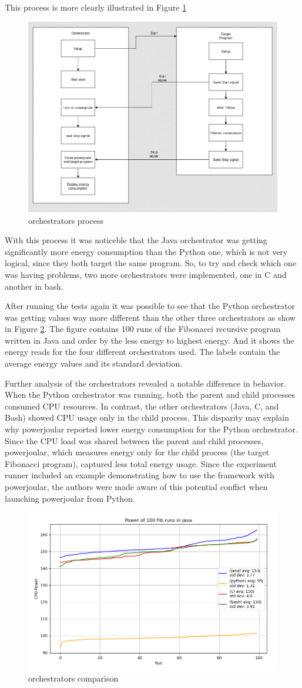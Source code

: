 \documentclass[sigplan]{acmart}
\begin{document}
This process is more clearly illustrated in Figure \ref{fig:orchestrators_process}

\begin{figure}%
  \centering
  \includegraphics[width = 0.4 \textwidth]{figures/orchestrators_process.png}
  \caption{orchestrators process}
  \label{fig:orchestrators_process}
\end{figure}

With this process it was noticeble that the Java orchestrator was getting significantly more energy consumption than the Python one, which is not very logical, since they both target the same program. So, to try and check which one was having problems, two more orchestrators were implemented, one in C and another in bash.

After running the tests again it was possible to see that the Python orchestrator was getting values way more different than the other three orchestrators as show in Figure \ref{fig:4_orchs_comparison}.
The figure contains 100 runs of the Fibonacci recursive program written in Java and order by the less energy to highest energy. And it shows the energy reads for the four different orchestrators used. The labels contain the average energy values and its standard deviation.

Further analysis of the orchestrators revealed a notable difference in behavior. When the Python orchestrator was running, both the parent and child processes consumed CPU resources. In contrast, the other orchestrators (Java, C, and Bash) showed CPU usage only in the child process. This disparity may explain why powerjoular reported lower energy consumption for the Python orchestrator. Since the CPU load was shared between the parent and child processes, powerjoular, which measures energy only for the child process (the target Fibonacci program), captured less total energy usage.
Since the experiment runner included an example demonstrating how to use the framework with powerjoular, the authors were made aware of this potential conflict when launching powerjoular from Python.

\begin{figure}%
  \centering
  \includegraphics[width = 0.5 \textwidth]{figures/4_orchestrators_comparison.png}
  \caption{orchestrators comparison}
  \label{fig:4_orchs_comparison}
\end{figure}
\end{document}
